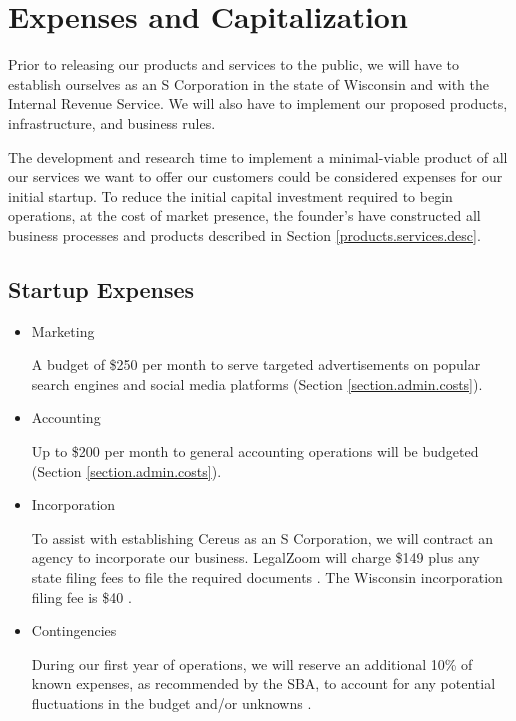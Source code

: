 {\let\cleardoublepage\relax \chapter{Expenses and Capitalization}}

Prior to releasing our products and services to the public, we will have to establish ourselves as an S Corporation in the state of Wisconsin and with the Internal Revenue Service. We will also have to implement our proposed products, infrastructure, and business rules.

The development and research time to implement a minimal-viable product of all our services we want to offer our customers could be considered expenses for our initial startup. To reduce the initial capital investment required to begin operations, at the cost of market presence, the founder's have constructed all business processes and products described in Section \ref{products.services.desc}.

\section{Startup Expenses} \label {startup.exp}

\begin{itemize}

\item Marketing

A budget of \$250 per month to serve targeted advertisements on popular search engines and social media platforms (Section \ref{section.admin.costs}).

\item Accounting

Up to \$200 per month to general accounting operations will be budgeted (Section \ref{section.admin.costs}). 

\item Incorporation

To assist with establishing Cereus as an S Corporation, we will contract an agency to incorporate our business. LegalZoom will charge \$149 plus any state filing fees to file the required documents \cite{legalzoom.2020}. The Wisconsin incorporation filing fee is \$40 \cite{wi.2018}.

\item Contingencies

During our first year of operations, we will reserve an additional 10\% of known expenses, as recommended by the SBA, to account for any potential fluctuations in the budget and/or unknowns \cite{sba.2020}.

\end{itemize}


